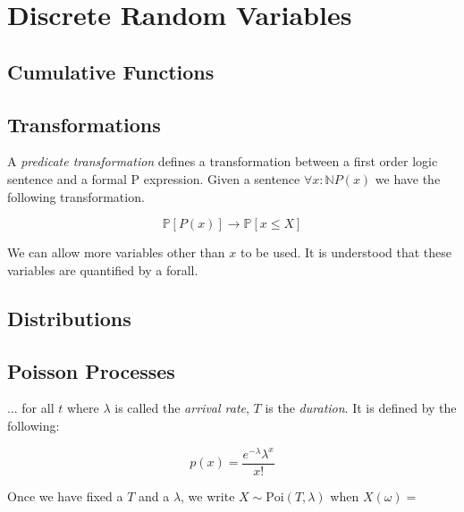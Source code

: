 
\chapter{Discrete Random Variables}







\section{Cumulative Functions}




\section{Transformations}


A \textit{predicate transformation}
defines a transformation between a first order logic 
sentence and a formal P expression. 
Given a sentence $\forall x : \mathbb{N} P(x)$ 
we have the following transformation.

$$\mathbb{P}[P(x)] \rightarrow \mathbb{P}[x \leqslant X]$$

We can allow more variables other than $x$ to be used. 
It is understood that these variables are quantified by a forall.




\section{Distributions}



\section{Poisson Processes}


... for all $t$ where $\lambda$ is called the \textit{arrival rate}, 
$T$ is the \textit{duration}. 
It is defined by the following:

$$
p(x) = \frac{e^{-\lambda}\lambda^{x}}{x!}
$$

Once we have fixed a $T$ and a $\lambda$, we write $X \sim \text{Poi}(T, \lambda)$ 
when $X(\omega) = $

